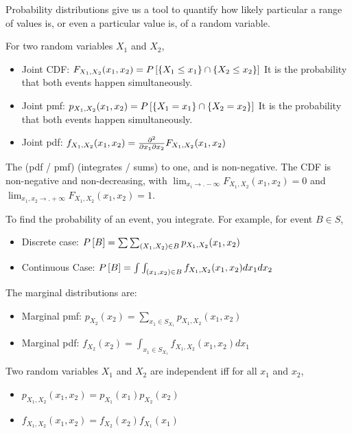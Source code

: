Probability distributions give us a tool to quantify how likely particular a range of values is, or even a particular value is, of a random variable.  

\vspace{0.15in}\noindent For two random variables $X_1$ and $X_2$,
\begin{itemize}
  \item Joint CDF: $F_{X_1, X_2}(x_1, x_2) = P\left[{\{X_1 \le x_1\}
    \cap \{X_2 \le x_2\}}\right]$  It is the probability that both events
    happen simultaneously.
  \item Joint pmf: $p_{X_1, X_2}(x_1, x_2) = P\left[{\{X_1 = x_1\}
    \cap \{X_2 = x_2\}}\right]$  It is the probability that both events
    happen simultaneously.
  \item Joint pdf: $f_{X_1, X_2}(x_1, x_2) = \frac{\partial^2}{\partial x_1 \partial x_2} F_{X_1, X_2}(x_1, x_2)$
\end{itemize}
The (pdf / pmf) (integrates / sums) to one, and is non-negative.  The CDF is non-negative and non-decreasing, with 
$\lim_{x_i\rightarrow.-\infty} F_{X_1, X_2}(x_1, x_2) = 0$ and $\lim_{x_1,x_2 \rightarrow.+\infty} F_{X_1, X_2}(x_1, x_2) = 1$.



\vspace{0.15in}\noindent To find the probability of an event, you
integrate.  For example, for event $B \in S$,
\begin{itemize}
  \item Discrete case: $P\left[{B}\right] = \sum \sum_{(X_1,X_2) \in B} p_{X_1, X_2}(x_1, x_2)$
  \item Continuous Case: $P\left[{B}\right] = \int \int_{(x_1,x_2) \in B} f_{X_1, X_2}(x_1,  x_2) dx_1 dx_2$
\end{itemize}

\vspace{0.15in}\noindent The marginal distributions are:
\begin{itemize}
  \item Marginal pmf: $p_{X_2}(x_2) = \sum_{x_1 \in S_{X_1}} p_{X_1, X_2}(x_1, x_2)$
  \item Marginal pdf: $f_{X_2}(x_2) = \int_{x_1 \in S_{X_1}} f_{X_1, X_2}(x_1,
  x_2) dx_1$
\end{itemize}

\vspace{0.15in}\noindent Two random variables $X_1$ and $X_2$ are
independent iff for all $x_1$ and $x_2$,
\begin{itemize}
  \item $p_{X_1, X_2}(x_1, x_2) = p_{X_1}(x_1) p_{X_2}(x_2)$
  \item $f_{X_1, X_2}(x_1, x_2) = f_{X_2}(x_2) f_{X_1}(x_1)$
\end{itemize}

